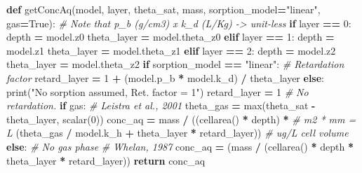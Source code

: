 \documentclass[]{article}
\newenvironment{Shaded}{\begin{snugshade}}{\end{snugshade}}
\newcommand{\KeywordTok}[1]{\textcolor[rgb]{0.13,0.29,0.53}{\textbf{#1}}}
\newcommand{\DecValTok}[1]{\textcolor[rgb]{0.00,0.00,0.81}{#1}}
\newcommand{\StringTok}[1]{\textcolor[rgb]{0.31,0.60,0.02}{#1}}
\newcommand{\CommentTok}[1]{\textcolor[rgb]{0.56,0.35,0.01}{\textit{#1}}}
\newcommand{\VariableTok}[1]{\textcolor[rgb]{0.00,0.00,0.00}{#1}}
\newcommand{\ControlFlowTok}[1]{\textcolor[rgb]{0.13,0.29,0.53}{\textbf{#1}}}
\newcommand{\OperatorTok}[1]{\textcolor[rgb]{0.81,0.36,0.00}{\textbf{#1}}}
\newcommand{\BuiltInTok}[1]{#1}
\newcommand{\NormalTok}[1]{#1}
\begin{document}
\begin{Shaded}
\begin{Highlighting}[]
\KeywordTok{def}\NormalTok{ getConcAq(model, layer, theta_sat, mass,}
\NormalTok{              sorption_model}\OperatorTok{=}\StringTok{"linear"}\NormalTok{, gas}\OperatorTok{=}\VariableTok{True}\NormalTok{):}
    \CommentTok{# Note that p_b (g/cm3) x k_d (L/Kg) -> unit-less}
    \ControlFlowTok{if}\NormalTok{ layer }\OperatorTok{==} \DecValTok{0}\NormalTok{:}
\NormalTok{        depth }\OperatorTok{=}\NormalTok{ model.z0}
\NormalTok{        theta_layer }\OperatorTok{=}\NormalTok{ model.theta_z0}
    \ControlFlowTok{elif}\NormalTok{ layer }\OperatorTok{==} \DecValTok{1}\NormalTok{:}
\NormalTok{        depth }\OperatorTok{=}\NormalTok{ model.z1}
\NormalTok{        theta_layer }\OperatorTok{=}\NormalTok{ model.theta_z1}
    \ControlFlowTok{elif}\NormalTok{ layer }\OperatorTok{==} \DecValTok{2}\NormalTok{:}
\NormalTok{        depth }\OperatorTok{=}\NormalTok{ model.z2}
\NormalTok{        theta_layer }\OperatorTok{=}\NormalTok{ model.theta_z2}
    \ControlFlowTok{if}\NormalTok{ sorption_model }\OperatorTok{==} \StringTok{"linear"}\NormalTok{:}
        \CommentTok{# Retardation factor}
\NormalTok{        retard_layer }\OperatorTok{=} \DecValTok{1} \OperatorTok{+}\NormalTok{ (model.p_b }\OperatorTok{*}\NormalTok{ model.k_d) }\OperatorTok{/}\NormalTok{ theta_layer}
    \ControlFlowTok{else}\NormalTok{:}
        \BuiltInTok{print}\NormalTok{(}\StringTok{"No sorption assumed, Ret. factor = 1"}\NormalTok{)}
\NormalTok{        retard_layer }\OperatorTok{=} \DecValTok{1}  \CommentTok{# No retardation.}
    \ControlFlowTok{if}\NormalTok{ gas:  }\CommentTok{# Leistra et al., 2001}
\NormalTok{        theta_gas }\OperatorTok{=} \BuiltInTok{max}\NormalTok{(theta_sat }\OperatorTok{-}\NormalTok{ theta_layer, scalar(}\DecValTok{0}\NormalTok{))}
\NormalTok{        conc_aq }\OperatorTok{=}\NormalTok{ mass }\OperatorTok{/}\NormalTok{ ((cellarea() }\OperatorTok{*}\NormalTok{ depth) }\OperatorTok{*}  \CommentTok{# m2 * mm = L}
\NormalTok{                          (theta_gas }\OperatorTok{/}\NormalTok{ model.k_h }\OperatorTok{+}
\NormalTok{                           theta_layer }\OperatorTok{*}\NormalTok{ retard_layer))  }\CommentTok{# ug/L cell volume}
    \ControlFlowTok{else}\NormalTok{:  }\CommentTok{# No gas phase}
        \CommentTok{# Whelan, 1987}
\NormalTok{        conc_aq }\OperatorTok{=}\NormalTok{ (mass }\OperatorTok{/}\NormalTok{ (cellarea() }\OperatorTok{*}\NormalTok{ depth }\OperatorTok{*}\NormalTok{ theta_layer }\OperatorTok{*}\NormalTok{ retard_layer)) }
    \ControlFlowTok{return}\NormalTok{ conc_aq}
\end{Highlighting}
\end{Shaded}
\end{document}

